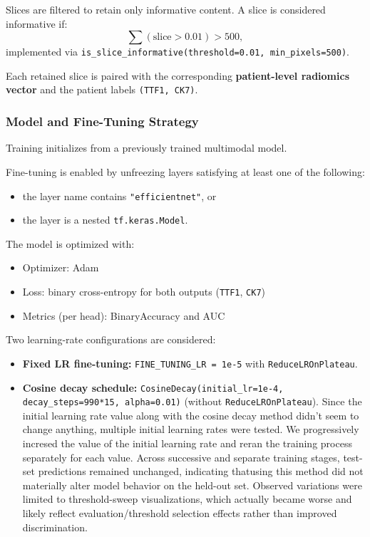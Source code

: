 Slices are filtered to retain only informative content. A slice is considered informative if:
\[
\sum(\text{slice} > 0.01) > 500,
\]
implemented via \texttt{is\_slice\_informative(threshold=0.01, min\_pixels=500)}.

Each retained slice is paired with the corresponding \textbf{patient-level radiomics vector} and the patient labels \texttt{(TTF1, CK7)}.

\subsubsection{Model and Fine-Tuning Strategy}
Training initializes from a previously trained multimodal model.

Fine-tuning is enabled by unfreezing layers satisfying at least one of the following:
\begin{itemize}
    \item the layer name contains \texttt{"efficientnet"}, or
    \item the layer is a nested \texttt{tf.keras.Model}.
\end{itemize}

The model is optimized with:
\begin{itemize}
    \item Optimizer: Adam
    \item Loss: binary cross-entropy for both outputs (\texttt{TTF1}, \texttt{CK7})
    \item Metrics (per head): BinaryAccuracy and AUC
\end{itemize}

Two learning-rate configurations are considered:
\begin{itemize}
    \item \textbf{Fixed LR fine-tuning:} \texttt{FINE\_TUNING\_LR = 1e-5} with \texttt{ReduceLROnPlateau}.
    \item \textbf{Cosine decay schedule:} \texttt{CosineDecay(initial\_lr=1e-4, decay\_steps=990*15, alpha=0.01)} (without \texttt{ReduceLROnPlateau}). Since the initial learning rate value along with the cosine decay method didn't seem to change anything, multiple initial learning rates were tested. We progressively incresed the value of the initial learning rate and reran the training process separately for each value. Across successive and separate training stages, test-set predictions remained unchanged, indicating thatusing this method did not materially alter model behavior on the held-out set. Observed variations were limited to threshold-sweep visualizations, which actually became worse and likely reflect evaluation/threshold selection effects rather than improved discrimination.
\end{itemize}

